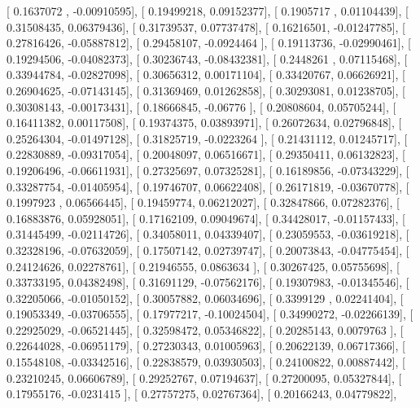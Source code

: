 \documentclass{article}
\begin{document}
       [ 0.1637072 , -0.00910595],
       [ 0.19499218,  0.09152377],
       [ 0.1905717 ,  0.01104439],
       [ 0.31508435,  0.06379436],
       [ 0.31739537,  0.07737478],
       [ 0.16216501, -0.01247785],
       [ 0.27816426, -0.05887812],
       [ 0.29458107, -0.0924464 ],
       [ 0.19113736, -0.02990461],
       [ 0.19294506, -0.04082373],
       [ 0.30236743, -0.08432381],
       [ 0.2448261 ,  0.07115468],
       [ 0.33944784, -0.02827098],
       [ 0.30656312,  0.00171104],
       [ 0.33420767,  0.06626921],
       [ 0.26904625, -0.07143145],
       [ 0.31369469,  0.01262858],
       [ 0.30293081,  0.01238705],
       [ 0.30308143, -0.00173431],
       [ 0.18666845, -0.06776   ],
       [ 0.20808604,  0.05705244],
       [ 0.16411382,  0.00117508],
       [ 0.19374375,  0.03893971],
       [ 0.26072634,  0.02796848],
       [ 0.25264304, -0.01497128],
       [ 0.31825719, -0.0223264 ],
       [ 0.21431112,  0.01245717],
       [ 0.22830889, -0.09317054],
       [ 0.20048097,  0.06516671],
       [ 0.29350411,  0.06132823],
       [ 0.19206496, -0.06611931],
       [ 0.27325697,  0.07325281],
       [ 0.16189856, -0.07343229],
       [ 0.33287754, -0.01405954],
       [ 0.19746707,  0.06622408],
       [ 0.26171819, -0.03670778],
       [ 0.1997923 ,  0.06566445],
       [ 0.19459774,  0.06212027],
       [ 0.32847866,  0.07282376],
       [ 0.16883876,  0.05928051],
       [ 0.17162109,  0.09049674],
       [ 0.34428017, -0.01157433],
       [ 0.31445499, -0.02114726],
       [ 0.34058011,  0.04339407],
       [ 0.23059553, -0.03619218],
       [ 0.32328196, -0.07632059],
       [ 0.17507142,  0.02739747],
       [ 0.20073843, -0.04775454],
       [ 0.24124626,  0.02278761],
       [ 0.21946555,  0.0863634 ],
       [ 0.30267425,  0.05755698],
       [ 0.33733195,  0.04382498],
       [ 0.31691129, -0.07562176],
       [ 0.19307983, -0.01345546],
       [ 0.32205066, -0.01050152],
       [ 0.30057882,  0.06034696],
       [ 0.3399129 ,  0.02241404],
       [ 0.19053349, -0.03706555],
       [ 0.17977217, -0.10024504],
       [ 0.34990272, -0.02266139],
       [ 0.22925029, -0.06521445],
       [ 0.32598472,  0.05346822],
       [ 0.20285143,  0.0079763 ],
       [ 0.22644028, -0.06951179],
       [ 0.27230343,  0.01005963],
       [ 0.20622139,  0.06717366],
       [ 0.15548108, -0.03342516],
       [ 0.22838579,  0.03930503],
       [ 0.24100822,  0.00887442],
       [ 0.23210245,  0.06606789],
       [ 0.29252767,  0.07194637],
       [ 0.27200095,  0.05327844],
       [ 0.17955176, -0.0231415 ],
       [ 0.27757275,  0.02767364],
       [ 0.20166243,  0.04779822],
\end{document}
